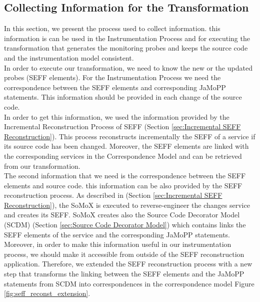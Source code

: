 \subsection{Collecting Information for the Transformation}
\label{sec:Collecting Information for the Transformation}
In this section, we present the process used to collect information. this information is can be used in the Instrumentation Process and for executing the transformation that generates the monitoring probes and keeps the source code and the instrumentation model consistent.\\

In order to execute our transformation, we need to know the new or the updated probes (SEFF elements).  For the Instrumentation Process we need the correspondence between the SEFF elements and corresponding JaMoPP statements. This information should be provided in each change of the source code. \\

In order to get this information, we used the information provided by the Incremental Reconstruction Process of SEFF (Section \ref{sec:Incremental SEFF Reconstruction}). This process reconstructs incrementally the SEFF of a service if its source code has been changed. Moreover, the SEFF elements are linked with the corresponding services in the Correspondence Model and can be retrieved from our transformation.\\

The second information that we need is the correspondence between the SEFF elements and source code. this information can be also provided by the SEFF reconstruction process. As described in (Section \ref{sec:Incremental SEFF Reconstruction}), the SoMoX is executed to reverse-engineer the changes service and creates its SEFF. SoMoX creates also the Source Code Decorator Model (SCDM) (Section \ref{sec:Source Code Decorator Model}) which contains links the SEFF elements of the service and the corresponding JaMoPP statements. Moreover, in order to make this information useful in our instrumentation process, we should make it accessible from outside of the SEFF reconstruction application. Therefore, we extended the SEFF reconstruction process with a new step that transforms the linking between the SEFF elements and the JaMoPP statements from SCDM into correspondences in the correspondence model Figure \ref{fig:seff_reconst_extension}. \\



